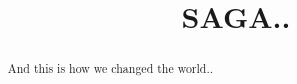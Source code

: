 \documentclass[10pt,letterpaper]{article}
\begin{document}
\title{SAGA..} 





\begin{abstract}
  And this is how we changed the world..

\end{abstract}



\maketitle
\end{document}
